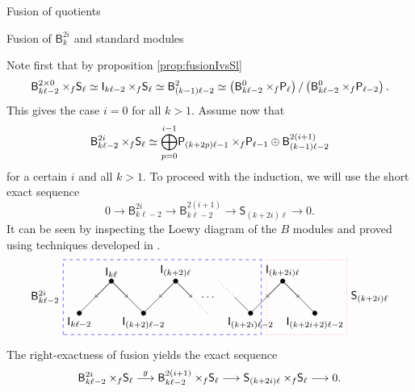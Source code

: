 \documentclass[reqno]{amsart}
\newcommand{\ds}[1]{\mathsf S_{#1}}
\newcommand{\dl}[1]{\mathsf I_{#1}}
\newcommand{\dP}[1]{\mathsf P_{#1}}
\newcommand{\xf}{\times\hspace{-0.27em}_f}
\newcommand{\B}[2]{\mathsf{B}^{#1}_{#2}}
\newcommand{\lc}{\ell}
\begin{document}
\begin{section}{Fusion of quotients}
\begin{subsection}{Fusion of $\B{2i}{k}$ and standard modules}
 
Note first that by proposition \ref{prop:fusionIvsSl}
\begin{equation}
\B{2 \times 0}{k\lc -2} \xf \ds{\lc} \simeq \dl{k\lc-2} \xf \ds{\lc} \simeq \B{2}{(k-1)\lc-2} \simeq \left(\B{0}{k\lc -2} \xf \dP{\lc}\right)/ \left( \B{0}{k\lc -2} \xf \dP{\lc-2} \right).
\end{equation}
This gives the case $i=0$ for all $k>1$. Assume now that 
\begin{equation*}
 	\B{2i}{k \lc -2} \xf \ds{\lc} \simeq \overset{i-1}{\underset{p = 0}{\bigoplus}}\dP{(k+2p)\lc-1} \xf \dP{\lc-1} \oplus \B{2(i+1)}{(k-1)\lc-2}
\end{equation*}
for a certain  $i$ and all $k>1$. To proceed with the induction, we will use the short exact sequence
\begin{equation}
	0 \longrightarrow \B{2i}{k \lc -2} \longrightarrow \B{2(i+1)}{k\lc -2} \longrightarrow \ds{(k+2i)\lc}\longrightarrow 0.
\end{equation}
It can be seen by inspecting the Loewy diagram of the $B$ modules and proved using techniques developed in \cite{BelRiSy}.
\begin{equation*}
\begin{tikzpicture}[scale=1/3]
\filldraw	
	   (0,0) circle (6 pt) node[anchor = north] {$\dl{k \lc -2}$}
 	-- (3,3) circle (6 pt) node[anchor = south] {$\dl{k \lc }$}
 	-- (6,0) circle (6 pt) node[anchor = north] {$\dl{(k+2)\lc-2}$}
	-- (9,3) circle (6 pt) node[anchor = south] {$\dl{(k+2)\lc}$};
\draw (9,3) -- (10.5,1.5);
\draw[dotted] (10.5,1.5) -- (12,0);
\node at (12,1.5) {$\hdots$};
\draw[dotted] (13,3) -- (14.5,1.5);
\draw (14.5,1.5) -- (16,0);
\filldraw
	   (16,0) circle (6 pt) node[anchor = north] {$\dl{(k+2i)\lc -2}$}
	-- (19,3) circle (6 pt) node[anchor = south] {$\dl{(k+2i)\lc}$}
	-- (22,0) circle (6 pt) node[anchor = north] {$\dl{ (k+2i+2)\lc-2}$};
\draw[->] (3,3) -- (1.5,1.5);
\draw[->] (3,3) -- (4.5,1.5);
\draw[->] (9,3) -- (7.5,1.5);
\draw[->] (9,3) -- (10.5,1.5);
\draw[->] (19,3) -- (17.5,1.5);
\draw[->] (19,3) -- (20.5,1.5);
%
\draw[dashed, blue] (-1.5,-2) -- (-1.5,5) -- (17,5) -- (17,-2) -- (-1.5,-2);
\node[anchor=east] at (-1.5,1.5) {$\B{2i}{k\lc-2}$};
\draw[dotted, red] (17.5,-2) -- (17.5,5) -- (25,5) -- (25,-2) -- (17.5,-2);
\node[anchor =west] at (25,1.5) {$\ds{(k+2i)\lc}$};
\end{tikzpicture}
\end{equation*}
The right-exactness of fusion yields the exact sequence
\begin{equation}
	\B{2i}{k \lc -2} \xf \ds{\lc}\overset{g}{\longrightarrow} \B{2(i+1)}{k \lc -2}\xf \ds{\lc} \longrightarrow \ds{(k+2i)\lc}\xf \ds{\lc}\longrightarrow 0.

\end{equation}
\end{subsection}
\end{section}
\end{document}
